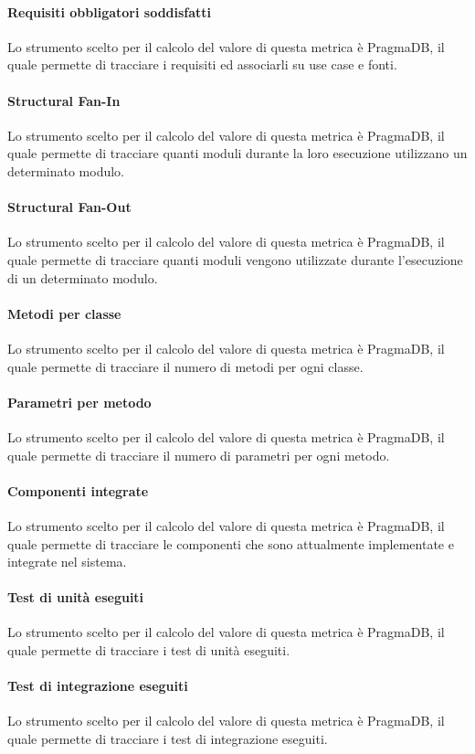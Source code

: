 \paragraph{Requisiti obbligatori soddisfatti}
Lo strumento scelto per il calcolo del valore di questa metrica è PragmaDB, il quale permette di tracciare i requisiti ed associarli su use case e fonti.
\paragraph{Structural Fan-In}
Lo strumento scelto per il calcolo del valore di questa metrica è PragmaDB, il quale permette di tracciare quanti moduli durante la loro esecuzione utilizzano un determinato modulo.
\paragraph{Structural Fan-Out}
Lo strumento scelto per il calcolo del valore di questa metrica è PragmaDB, il quale permette di tracciare quanti moduli vengono utilizzate durante l'esecuzione di un determinato modulo.
\paragraph{Metodi per classe}
Lo strumento scelto per il calcolo del valore di questa metrica è PragmaDB, il quale permette di tracciare il numero di metodi per ogni classe.
\paragraph{Parametri per metodo}
Lo strumento scelto per il calcolo del valore di questa metrica è PragmaDB, il quale permette di tracciare il numero di parametri per ogni metodo.
\paragraph{Componenti integrate}
Lo strumento scelto per il calcolo del valore di questa metrica è PragmaDB, il quale permette di tracciare le componenti che sono attualmente implementate e integrate nel sistema.
\paragraph{Test di unità eseguiti}
Lo strumento scelto per il calcolo del valore di questa metrica è PragmaDB, il quale permette di tracciare i test di unità eseguiti.
\paragraph{Test di integrazione eseguiti}
Lo strumento scelto per il calcolo del valore di questa metrica è PragmaDB, il quale permette di tracciare i test di integrazione eseguiti.

